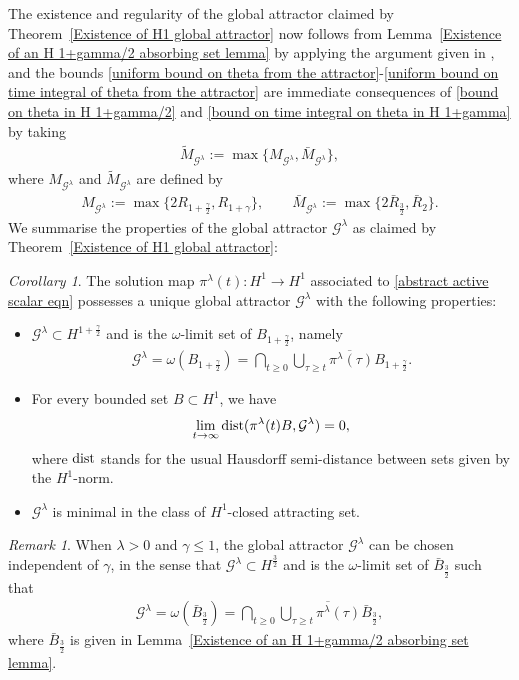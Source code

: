 \documentclass[reqno]{amsart}%
\theoremstyle{definition}
\theoremstyle{remark}
\numberwithin{equation}{section}
\newtheorem{corollary}[theorem]{Corollary}
\newtheorem{remark}[theorem]{Remark}
\newcommand{\1}{\mathbf{1}}
\newcommand{\Gg}{\mathcal{G}^{\lambda}}
\newcommand{\pin}{\pi^{\lambda}}
\newcommand{\dist}{\text{\rm dist}}
\numberwithin{equation}{section}
\numberwithin{theorem}{section}
\numberwithin{figure}{section}
\begin{document}
The existence and regularity of the global attractor claimed by Theorem~\ref{Existence of H1 global attractor} now follows from Lemma~\ref{Existence of an H 1+gamma/2 absorbing set lemma} by applying the argument given in \cite[Proposition~8]{CCP12}, and the bounds \eqref{uniform bound on theta from the attractor}-\eqref{uniform bound on time integral of theta from the attractor} are immediate consequences of \eqref{bound on theta in H 1+gamma/2} and \eqref{bound on time integral on theta in H 1+gamma} by taking 
\begin{align*}
\tilde{M}_{\Gg}:=\max\{M_{\Gg},\bar{M}_{\Gg}\},
\end{align*}
where $M_{\Gg}$ and $\tilde M_{\Gg}$ are defined by
\begin{align}\label{def of constant M on global attractor}
M_{\Gg}:=\max\{2R_{1+\frac{\gamma}{2}},R_{1+\gamma}\},\qquad\bar{M}_{\Gg}:=\max\{2\bar{R}_{\frac{3}{2}},\bar{R}_{2}\}.
\end{align}
We summarise the properties of the global attractor $\Gg$ as claimed by Theorem~\ref{Existence of H1 global attractor}:
\begin{corollary}\label{Unique attractor general corollary}
The solution map $\pin(t):H^1\to H^1$ associated to \eqref{abstract active scalar eqn} possesses a unique global attractor $\Gg$ with the following properties:
\begin{itemize}
\item $\Gg\subset H^{1+\frac{\gamma}{2}}$ and is the $\omega$-limit set of $B_{1+\frac{\gamma}{2}}$, namely
\begin{align*}
\Gg=\omega(B_{1+\frac{\gamma}{2}})=\bigcap_{t\ge0}\overline{\bigcup_{\tau\ge t}\pin(\tau) B_{1+\frac{\gamma}{2}}}.
\end{align*}
\item For every bounded set $B\subset H^1$, we have
\begin{align*}
\lim_{t\to\infty}\dist(\pin(t)B,\Gg)=0,
\end{align*}
where $\dist$ stands for the usual Hausdorff semi-distance between sets given by the $H^1$-norm.
\item $\Gg$ is minimal in the class of $H^1$-closed attracting set.
\end{itemize}
\end{corollary}
\begin{remark}
When $\lambda>0$ and $\gamma\le1$, the global attractor $\Gg$ can be chosen independent of $\gamma$, in the sense that $\Gg\subset H^{\frac{3}{2}}$ and is the $\omega$-limit set of $\bar{B}_{\frac{3}{2}}$ such that 
\begin{align*}
\Gg=\omega(\bar{B}_{\frac{3}{2}})=\bigcap_{t\ge0}\overline{\bigcup_{\tau\ge t}\pin(\tau) \bar{B}_{\frac{3}{2}}},
\end{align*}
where $\bar{B}_{\frac{3}{2}}$ is given in Lemma~\ref{Existence of an H 1+gamma/2 absorbing set lemma}.
\end{remark}
\end{document}
